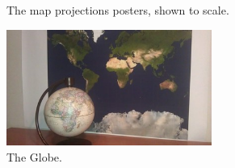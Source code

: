 \documentclass[a4paper,12pt]{article}
\begin{document}
\begin{figure}[h]
\begin{center}

\caption{The map projections posters, shown to scale.}
\end{center}
\end{figure}
\begin{figure}[h]
\begin{center}
\includegraphics[width=0.6\textwidth]{../common/globe.jpg}
\caption{The Globe.}
\end{center}
\end{figure}
\end{document}
